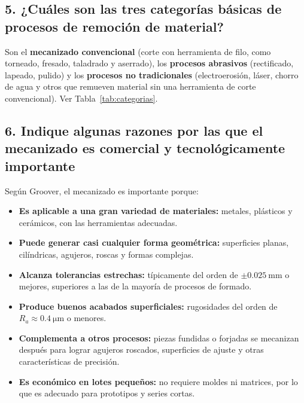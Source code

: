 \documentclass[12pt,a4paper]{article}
\begin{document}
\subsection*{5. ¿Cuáles son las tres categorías básicas de procesos de remoción
	de material?}

Son el \textbf{mecanizado convencional} (corte con herramienta de filo, como
torneado, fresado, taladrado y aserrado), los \textbf{procesos abrasivos}
(rectificado, lapeado, pulido) y los \textbf{procesos no tradicionales}
(electroerosión, láser, chorro de agua y otros que remueven material sin una
herramienta de corte convencional). Ver Tabla~\ref{tab:categorias}.

\subsection*{6. Indique algunas razones por las que el mecanizado es comercial y
	tecnológicamente importante}

Según Groover, el mecanizado es importante porque:

\begin{itemize}
	\item \textbf{Es aplicable a una gran variedad de materiales:} metales,
	      plásticos y cerámicos, con las herramientas adecuadas.\\[-10pt]
	\item \textbf{Puede generar casi cualquier forma geométrica:} superficies
	      planas, cilíndricas, agujeros, roscas y formas complejas.\\[-10pt]
	\item \textbf{Alcanza tolerancias estrechas:} típicamente del orden de
	      $\pm\SI{0.025}{\milli\metre}$ o mejores, superiores a las de la mayoría
	      de
	      procesos de formado.\\[-10pt]
	\item \textbf{Produce buenos acabados superficiales:} rugosidades del orden de
	      $R_a\approx\SI{0.4}{\micro\metre}$ o menores.\\[-10pt]
	\item \textbf{Complementa a otros procesos:} piezas fundidas o forjadas se
	      mecanizan después para lograr agujeros roscados, superficies de ajuste
	      y otras características de precisión.\\[-10pt]
	\item \textbf{Es económico en lotes pequeños:} no requiere moldes ni matrices,
	      por lo que es adecuado para prototipos y series cortas.
\end{itemize}
\end{document}
